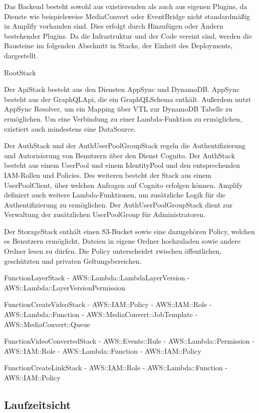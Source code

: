 Das Backend besteht sowohl aus existierenden als auch aus eigenen Plugins, da Dienste wie beispielsweise MediaConvert oder EventBridge nicht standardmäßig in Amplify vorhanden sind. Dies erfolgt durch Hinzufügen oder Ändern bestehender Plugins. Da die Infrastruktur und der Code vereint sind, werden die Bausteine im folgenden Abschnitt in Stacks, der Einheit des Deployments, dargestellt.

RootStack

Der ApiStack besteht aus den Diensten AppSync und DynamoDB. AppSync besteht aus der GraphQLApi, die ein GraphQLSchema enthält. Außerdem nutzt AppSync Resolver, um ein Mapping über VTL zur DynamoDB Tabelle zu ermöglichen. Um eine Verbindung zu einer Lambda-Funktion zu ermöglichen, existiert auch mindestens eine DataSource.

Der AuthStack und der AuthUserPoolGroupStack regeln die Authentifizierung und Autorisierung von Benutzern über den Dienst Cognito. Der AuthStack besteht aus einem UserPool und einem IdentityPool und den entsprechenden IAM-Rollen und Policies. Des weiteren besteht der Stack aus einem UserPoolClient, über welchen Anfragen auf Cognito erfolgen können. Amplify definiert auch weitere Lambda-Funktionen, um zusätzliche Logik für die Authentifizierung zu ermöglichen. Der AuthUserPoolGroupStack dient zur Verwaltung der zusätzlichen UserPoolGroup für Administratoren.

Der StorageStack enthält einen S3-Bucket sowie eine dazugehören Policy, welchen es Benutzern ermöglicht, Dateien in eigene Ordner hochzuladen sowie andere Ordner lesen zu dürfen. Die Policy unterscheidet zwischen öffentlichen, geschützten und privaten Geltungsbereichen.



FunctionLayerStack
  - AWS::Lambda::LambdaLayerVersion
  - AWS::Lambda::LayerVersionPermission

FunctionCreateVideoStack
  - AWS::IAM::Policy
  - AWS::IAM::Role
  - AWS::Lambda::Function
  - AWS::MediaConvert::JobTemplate
  - AWS::MediaConvert::Queue

FunctionVideoConvertedStack
- AWS::Events::Rule
- AWS::Lambda::Permission
- AWS::IAM::Role
- AWS::Lambda::Function
- AWS::IAM::Policy

FunctionCreateLinkStack
- AWS::IAM::Role
- AWS::Lambda::Function
- AWS::IAM::Policy

\subsection{Laufzeitsicht}

